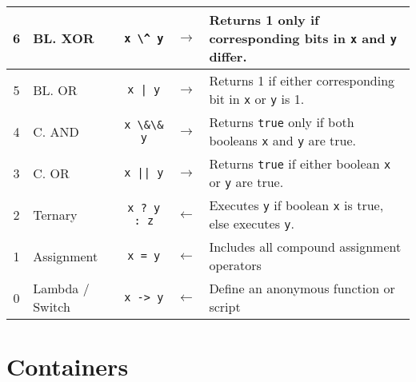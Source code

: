 \documentclass{article}
\begin{document}
\begin{center}
\begin{tabularx}{\textwidth}{clccX}
                  6   & BL. XOR           & \lstinline|x \^ y|    & \(\to\) & Returns 1 only if corresponding bits in \lstinline|x| and \lstinline|y| differ.\\\midrule
                  5   & BL. OR            & \lstinline+x | y+     & \(\to\) & Returns 1 if either corresponding bit in \lstinline|x| or \lstinline|y| is 1.\\\midrule
                  4   & C. AND            & \lstinline|x \&\& y|  & \(\to\) & Returns \lstinline|true| only if both booleans \lstinline|x| and \lstinline|y| are true.\\\midrule
                  3   & C. OR             & \lstinline+x || y+    & \(\to\) & Returns \lstinline|true| if either boolean \lstinline|x| or \lstinline|y| are true.\\\midrule
                  2   & Ternary           & \lstinline|x ? y : z| & \(\gets\) & Executes \lstinline|y| if boolean \lstinline|x| is true, else executes \lstinline|y|.\\\midrule
                  1   & Assignment        & \lstinline!x = y!     & \(\gets\) & Includes all compound assignment operators \\\midrule
                  0   & Lambda / Switch   & \lstinline|x -> y|    & \(\gets\) & Define an anonymous function or script\\\bottomrule
\end{tabularx}\end{center}

\section{Containers}
\end{document}
